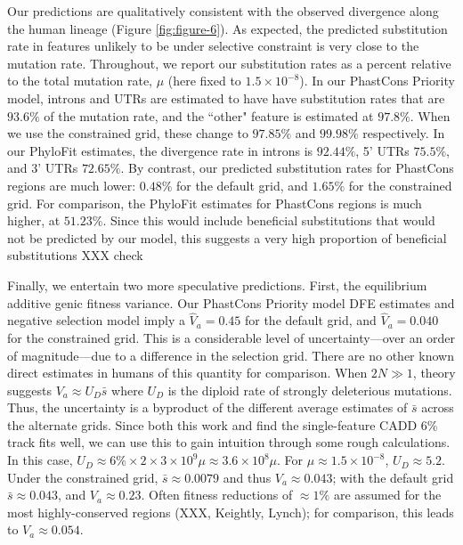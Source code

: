 \documentclass[11pt]{article}
\begin{document}
Our predictions are qualitatively consistent with the observed divergence along
the human lineage (Figure \ref{fig:figure-6}). As expected, the predicted
substitution rate in features unlikely to be under selective constraint is very
close to the mutation rate. Throughout, we report our substitution rates as a
percent relative to the total mutation rate, $\mu$ (here fixed to $1.5 \times
10^{-8}$). In our PhastCons Priority model, introns and UTRs are estimated to
have have substitution rates that are $93.6\%$ of the mutation rate, and the
``other" feature is estimated at $97.8\%$.  When we use the constrained grid,
these change to $97.85\%$ and $99.98\%$ respectively. In our PhyloFit
estimates, the divergence rate in introns is $92.44\%$, 5' UTRs $75.5\%$, and
3' UTRs $72.65\%$. By contrast, our predicted substitution rates for PhastCons
regions are much lower: $0.48\%$ for the default grid, and $1.65\%$ for the
constrained grid. For comparison, the PhyloFit estimates for PhastCons regions
is much higher, at $51.23\%$. Since this would include beneficial substitutions
that would not be predicted by our model, this suggests a very high proportion
of beneficial substitutions XXX check



Finally, we entertain two more speculative predictions. First, the equilibrium
additive genic fitness variance. Our PhastCons Priority model DFE estimates and
negative selection model imply a $\widehat{V}_a = 0.45$ for the default grid,
and $\widehat{V}_a = 0.040$ for the constrained grid. This is a considerable
level of uncertainty---over an order of magnitude---due to a difference in the
selection grid. There are no other known direct estimates in humans of this
quantity for comparison. When $2N \gg 1$, theory suggests $V_a \approx
U_D\bar{s}$ where $U_D$ is the diploid rate of strongly deleterious mutations.
Thus, the uncertainty is a byproduct of the different average estimates of
$\bar{s}$ across the alternate grids. Since both this work and
\textcite{Murphy2022-sj} find the single-feature CADD 6\% track fits well, we
can use this to gain intuition through some rough calculations. In this case,
$U_D \approx 6\% \times 2 \times 3 \times 10^{9} \mu \approx 3.6 \times 10^{8}
\mu$. For $\mu \approx 1.5 \times 10^{-8}$, $U_D \approx 5.2$. Under the
constrained grid, ${\bar{s}} \approx 0.0079$ and thus $V_a \approx 0.043$; with
the default grid $\bar{s} \approx 0.043$, and $V_a \approx 0.23$. Often fitness
reductions of $\approx 1\%$ are assumed for the most highly-conserved regions
(XXX, Keightly, Lynch); for comparison, this leads to $V_a \approx 0.054$.
\end{document}
